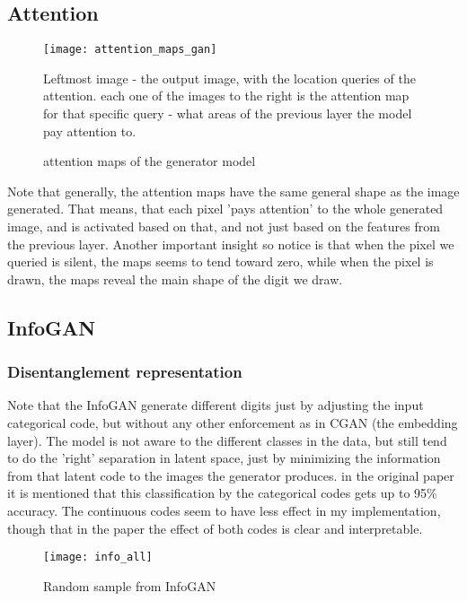 \subsection{Attention}

\begin{figure}[h]
\centering
\texttt{[image: attention\_maps\_gan]}
\caption{attention maps of the generator model}
\label{fig:x cubed graph}
Leftmost image - the output image, with the location queries of the attention. each one of the images to the right is the attention map for that specific query - what areas of the previous layer the model pay attention to.
\end{figure}

Note that generally, the attention maps have the same general shape as the image generated. That means, that each pixel 'pays attention' to the whole generated image, and is activated based on that, and not just based on the features from the previous layer.
Another important insight so notice is that when the pixel we queried is silent, the maps seems to tend toward zero, while when the pixel is drawn, the maps reveal the main shape of the digit we draw.


\subsection{InfoGAN}


\subsubsection{Disentanglement representation}

Note that the InfoGAN generate different digits just by adjusting the input categorical code, but without any other enforcement as in CGAN (the embedding layer). The model is not aware to the different classes in the data, but still tend to do the 'right' separation in latent space, just by minimizing the information from that latent code to the images the generator produces. in the original paper it is mentioned that this classification by the categorical codes gets up to 95\% accuracy.
The continuous codes seem to have less effect in my implementation, though that in the paper the effect of both codes is clear and interpretable. 



\begin{figure}[h]
\centering
\texttt{[image: info\_all]}
\caption{Random sample from InfoGAN}
\label{fig:x cubed graph}
\end{figure}

